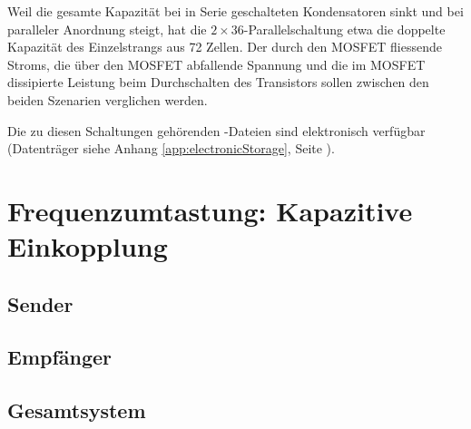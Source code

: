 Weil die gesamte Kapazit\"at bei in Serie geschalteten Kondensatoren sinkt und
bei  paralleler  Anordnung steigt,  hat  die  $2 \times  36$-Parallelschaltung
 etwa die doppelte Kapazit\"at des Einzelstrangs
aus 72 Zellen. Der  durch den MOSFET fliessende Stroms, die  \"uber den MOSFET
abfallende Spannung und die im  MOSFET dissipierte Leistung beim Durchschalten
des Transistors sollen zwischen den beiden Szenarien verglichen werden.

Die zu  diesen Schaltungen geh\"orenden -Dateien  sind elektronisch
verf\"ugbar  (Datentr\"ager  siehe Anhang  \ref{app:electronicStorage},  Seite
\pageref{app:electronicStorage}).



\section{Frequenzumtastung: Kapazitive Einkopplung}
\label{sec:simu:fsk:capacitive}

\subsection{Sender}
\label{sec:simu:fsk:capacitive:transmitter}

\subsection{Empf\"anger}
\label{sec:simu:fsk:capacitive:receiver}

\subsection{Gesamtsystem}
\label{sec:simu:fsk:capacitive:system}

